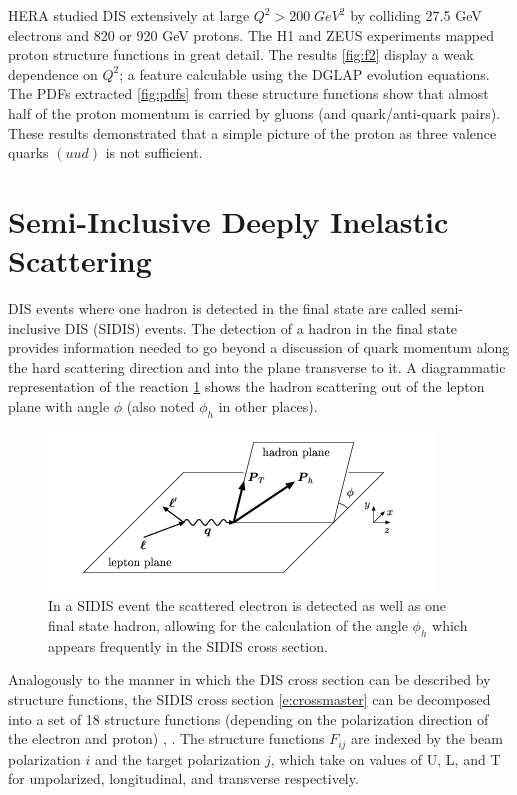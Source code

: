 HERA studied DIS extensively at large $Q^2 > 200 \; GeV^2$ by colliding 27.5 GeV electrons and 820 or 920 GeV protons.  The H1 and ZEUS experiments mapped proton structure functions in great detail.  The results \ref{fig:f2} display a weak dependence on $Q^2$; a feature calculable using the DGLAP evolution equations.  The PDFs extracted \ref{fig:pdfs} from these structure functions show that almost half of the proton momentum is carried by gluons (and quark/anti-quark pairs).  These results demonstrated that a simple picture of the proton as three valence quarks $(uud)$ is not sufficient.    

\section{Semi-Inclusive Deeply Inelastic Scattering}
DIS events where one hadron is detected in the final state are called semi-inclusive DIS (SIDIS) events.  The detection of a hadron in the final state provides information needed to go beyond a discussion of quark momentum along the hard scattering direction and into the plane transverse to it.  A diagrammatic representation of the reaction \ref{fig:sidis} shows the hadron scattering out of the lepton plane with angle $\phi$ (also noted $\phi_h$ in other places).

\begin{figure}
	\centering
	\label{fig:sidis}
	\includegraphics[width = \textwidth]{image/diagrams/phi-hadron.png}	
	\caption[Diagrammatic representation of SIDIS with hadronic $\phi_h$ angle.]{In a SIDIS event the scattered electron is detected as well as one final state hadron, allowing for the calculation of the angle $\phi_h$ which appears frequently in the SIDIS cross section.}
\end{figure}

Analogously to the manner in which the DIS cross section can be described by structure functions, the SIDIS cross section \ref{e:crossmaster} can be decomposed into a set of 18 structure functions (depending on the polarization direction of the electron and proton) \cite{tmds-mulders:1995}, \cite{tmds-bacchetta:2006}.  The structure functions $F_{ij}$ are indexed by the beam polarization $i$ and the target polarization $j$, which take on values of U, L, and T for unpolarized, longitudinal, and transverse respectively.

